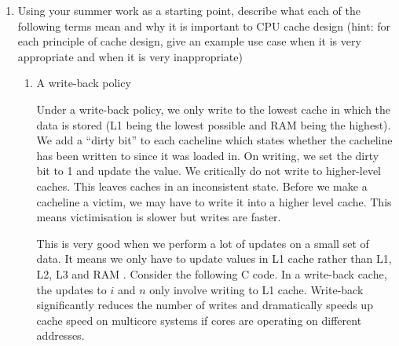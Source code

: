 \documentclass[10pt,\jkfside,a4paper]{article}
\begin{document}
\begin{enumerate}
\begin{examquestion}{2004}{6}{2}
\begin{enumerate}[label=(\alph*)]
\begin{itemize}
\item Conditional branches will cause four pipeline bubbles. Conditional
branches require arithmetic to determine whether the branch will be taken.
Therefore the processor cannot determine the next instruction until after
the execute stage.

\item Unconditional branches which require arithmetic such as JALR will
cause four pipeline bubbles. The processor cannot determine the address of the
jump (and the next instruction) until after arithmetic has been performed in
the execute stage.

\item Unconditional branches by constant amounts or register-amounts will
cause two pipeline bubbles. The processor can determine the next instruction
after the immediate from the instruction is decoded -- at the start of the
execute stage.

\end{itemize}

\end{enumerate}

\end{examquestion}

\item Using your summer work as a starting point, describe what each of the
following terms mean and why it is important to CPU cache design (hint: for
each principle of cache design, give an example use case when it is very
appropriate and when it is very inappropriate)

\begin{enumerate}[label=(\alph*)]

\item A write-back policy

Under a write-back policy, we only write to the lowest cache in which the
data is stored (L1 being the lowest possible and RAM being the highest). We
add a ``dirty bit'' to each cacheline which states whether the cacheline has
been written to since it was loaded in. On writing, we set the dirty bit to
1 and update the value. We critically do not write to higher-level caches.
This leaves caches in an inconsistent state. Before we make a cacheline a
victim, we may have to write it into a higher level cache. This means
victimisation is slower but writes are faster.

This is very good when we perform a lot of updates on a small set of data.
It means we only have to update values in L1 cache rather than L1, L2, L3
and RAM . Consider the following C code. In a write-back cache, the updates
to $i$ and $n$ only involve writing to L1 cache. Write-back significantly
reduces the number of writes and dramatically speeds up cache speed on
multicore systems if cores are operating on different addresses.


\end{enumerate}
\end{enumerate}
\end{document}
